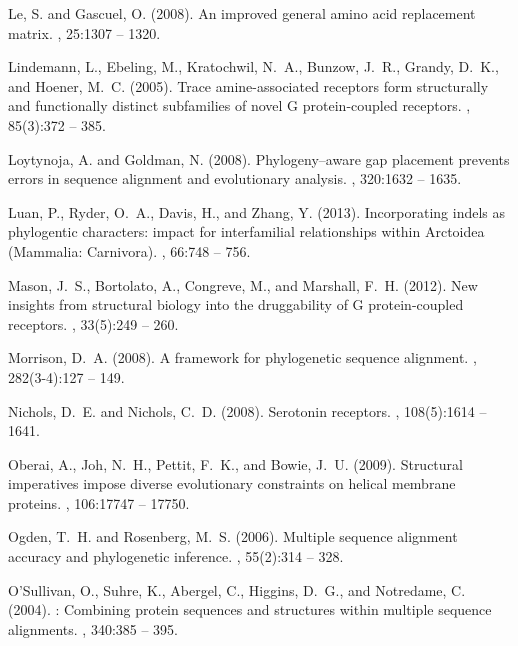 \documentclass[fleqn,10pt]{wlpeerj}
\begin{document}
\begin{thebibliography}{}
Le, S. and Gascuel, O. (2008).
\newblock An improved general amino acid replacement matrix.
, 25:1307 -- 1320.

Lindemann, L., Ebeling, M., Kratochwil, N.~A., Bunzow, J.~R., Grandy, D.~K.,
  and Hoener, M.~C. (2005).
\newblock Trace amine-associated receptors form structurally and functionally
  distinct subfamilies of novel {G} protein-coupled receptors.
, 85(3):372 -- 385.

Loytynoja, A. and Goldman, N. (2008).
\newblock Phylogeny--aware gap placement prevents errors in sequence alignment
  and evolutionary analysis.
, 320:1632 -- 1635.

Luan, P., Ryder, O.~A., Davis, H., and Zhang, Y. (2013).
\newblock Incorporating indels as phylogentic characters: impact for
  interfamilial relationships within {Arctoidea (Mammalia: Carnivora)}.
, 66:748 -- 756.

Mason, J.~S., Bortolato, A., Congreve, M., and Marshall, F.~H. (2012).
\newblock New insights from structural biology into the druggability of {G}
  protein-coupled receptors.
, 33(5):249 -- 260.

Morrison, D.~A. (2008).
\newblock A framework for phylogenetic sequence alignment.
, 282(3-4):127 -- 149.

Nichols, D.~E. and Nichols, C.~D. (2008).
\newblock Serotonin receptors.
, 108(5):1614 -- 1641.

Oberai, A., Joh, N.~H., Pettit, F.~K., and Bowie, J.~U. (2009).
\newblock Structural imperatives impose diverse evolutionary constraints on
  helical membrane proteins.
, 106:17747 -- 17750.

Ogden, T.~H. and Rosenberg, M.~S. (2006).
\newblock Multiple sequence alignment accuracy and phylogenetic inference.
, 55(2):314 -- 328.

O'Sullivan, O., Suhre, K., Abergel, C., Higgins, D.~G., and Notredame, C.
  (2004).
: Combining protein sequences and structures within
  multiple sequence alignments.
, 340:385 -- 395.


\end{thebibliography}
\end{document}
